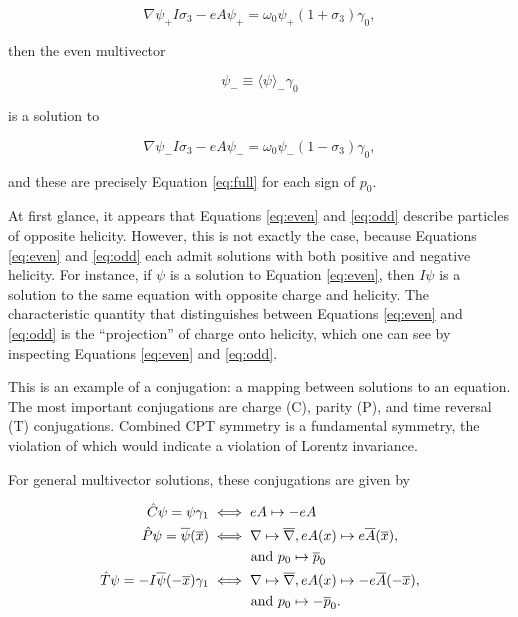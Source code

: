 \documentclass[twocolumn]{article}
\begin{document}
  \begin{equation}
    \nabla \psi_+ I \sigma_3 - e A \psi_+ = \omega_0 \psi_+ (1 + \sigma_3) \gamma_0,\label{eq:even}
  \end{equation}

  then the even multivector 

  \begin{equation}
    \psi_- \equiv \langle \psi \rangle_- \gamma_0\label{eq:0decomposition}
  \end{equation} 

  is a solution to

  \begin{equation}
    \nabla \psi_- I \sigma_3 - e A \psi_- = \omega_0 \psi_- (1 - \sigma_3) \gamma_0,\label{eq:odd}
  \end{equation}

  and these are precisely Equation \ref{eq:full} for each sign of $p_0$.

  At first glance, it appears that Equations \ref{eq:even} and \ref{eq:odd} describe particles of opposite helicity. However, this is not exactly the case, because Equations \ref{eq:even} and \ref{eq:odd} each admit solutions with both positive and negative helicity. For instance, if $\psi$ is a solution to Equation \ref{eq:even}, then $I \psi$ is a solution to the same equation with opposite charge and helicity. The characteristic quantity that distinguishes between Equations \ref{eq:even} and \ref{eq:odd} is the ``projection'' of charge onto helicity, which one can see by inspecting Equations \ref{eq:even} and \ref{eq:odd}.

  This is an example of a conjugation: a mapping between solutions to an equation. The most important conjugations are charge (C), parity (P), and time reversal (T) conjugations. Combined CPT symmetry is a fundamental symmetry, the violation of which would indicate a violation of Lorentz invariance.

  For general multivector solutions, these conjugations are given by

  \begin{align}
    \hat C \psi = \psi \gamma_1 &\iff eA \mapsto - eA \label{eq:charge}\\
    \hat P \psi = \overline \psi(\overline x) &\iff \nabla \mapsto \overline \nabla, eA(x) \mapsto e\overline A(\overline x), \notag \\ & \hspace{3em}\text{and } p_0 \mapsto \overline p_0 \label{eq:parity}\\
    \hat T \psi = -I \overline \psi(-\overline x) \gamma_1 &\iff \nabla \mapsto \overline\nabla, eA(x) \mapsto -e\overline A(-\overline x), \notag \\ & \hspace{3em} \text{and } p_0 \mapsto - \overline p_0.\label{eq:time}
  \end{align}
\end{document}
